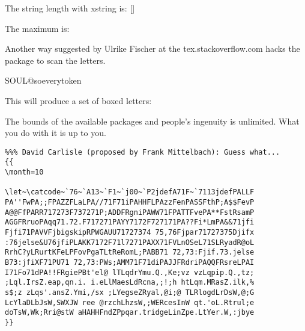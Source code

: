 \begin{teX}
The string length with xstring is: [\mmaximum]

The maximum is: \mmaximum \value{\mmaximum}


\begin{teX}

\end{teX}





Another way suggested by Ulrike Fischer at the tex.stackoverflow.com hacks the 
package to scan the letters.

\medskip
\begin{teX}
\makeatletter
\def\boxletter{SOUL@soeverytoken{%
   \fbox{\large \the\SOUL@token\strut}}
}
\boxletter
\makeatother
\end{teX}


This will produce a set of boxed letters:
\medskip 

\makeatletter
\bgroup
\def\SOUL@soeverytoken{%
   \fbox{\large \the\SOUL@token\strut}}
\egroup
\makeatother
{}

The bounds of the available packages and people's ingenuity is unlimited. What you do with it is up to you.



\begin{teX}
\newcommand{\numberstore}{4}

\isnumeric{\numberstore}

\setcounter{anumber}{\numberstore}

\theanumber
\end{teX}


\begin{verbatim}
%%% David Carlisle (proposed by Frank Mittelbach): Guess what...
{{
\month=10

\let~\catcode~`76~`A13~`F1~`j00~`P2jdefA71F~`7113jdefPALLF
PA''FwPA;;FPAZZFLaLPA//71F71iPAHHFLPAzzFenPASSFthP;A$$FevP
A@@FfPARR717273F737271P;ADDFRgniPAWW71FPATTFvePA**FstRsamP
AGGFRruoPAqq71.72.F717271PAYY7172F727171PA??Fi*LmPA&&71jfi
Fjfi71PAVVFjbigskipRPWGAUU71727374 75,76Fjpar71727375Djifx
:76jelse&U76jfiPLAKK7172F71l7271PAXX71FVLnOSeL71SLRyadR@oL
RrhC?yLRurtKFeLPFovPgaTLtReRomL;PABB71 72,73:Fjif.73.jelse
B73:jfiXF71PU71 72,73:PWs;AMM71F71diPAJJFRdriPAQQFRsreLPAI
I71Fo71dPA!!FRgiePBt'el@ lTLqdrYmu.Q.,Ke;vz vzLqpip.Q.,tz;
;Lql.IrsZ.eap,qn.i. i.eLlMaesLdRcna,;!;h htLqm.MRasZ.ilk,%
s$;z zLqs'.ansZ.Ymi,/sx ;LYegseZRyal,@i;@ TLRlogdLrDsW,@;G
LcYlaDLbJsW,SWXJW ree @rzchLhzsW,;WERcesInW qt.'oL.Rtrul;e
doTsW,Wk;Rri@stW aHAHHFndZPpqar.tridgeLinZpe.LtYer.W,:jbye
}}
\end{verbatim}



\end{teX}
